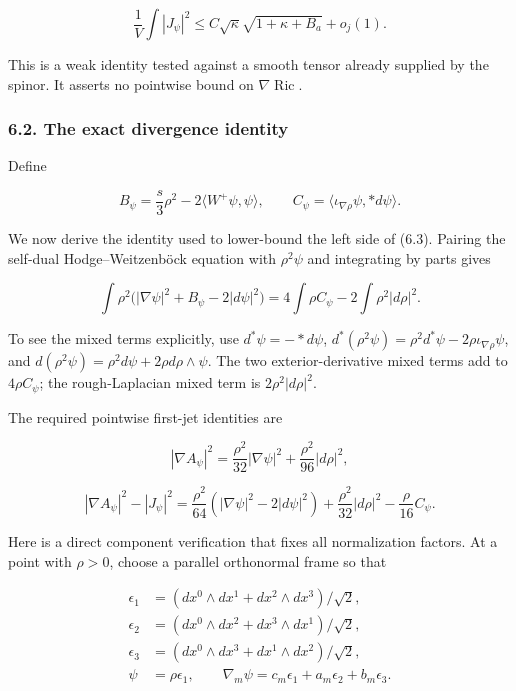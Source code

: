 \documentclass[
  11pt,
]{article}
\begin{document}
\[
 \frac1V\int|J_\psi|^2
            \le C\sqrt\kappa\sqrt{1+\kappa+B_a}+o_j(1).
 \tag{6.3}
\]

This is a weak identity tested against a smooth tensor already supplied
by the spinor. It asserts no pointwise bound on
\(\nabla\operatorname{Ric}\).

\hypertarget{the-exact-divergence-identity}{%
\subsubsection{6.2. The exact divergence
identity}\label{the-exact-divergence-identity}}

Define

\[
 B_\psi=\frac{s}{3}\rho^2-2\langle W^+\psi,\psi\rangle,
 \qquad C_\psi=\langle\iota_{\nabla\rho}\psi,*d\psi\rangle.
\]

We now derive the identity used to lower-bound the left side of (6.3).
Pairing the self-dual Hodge--Weitzenböck equation with \(\rho^2\psi\)
and integrating by parts gives

\[
 \int\rho^2\bigl(|\nabla\psi|^2+B_\psi-2|d\psi|^2\bigr)
          =4\int\rho C_\psi-2\int\rho^2|d\rho|^2.
 \tag{6.4}
\]

To see the mixed terms explicitly, use \(d^*\psi=-*d\psi\),
\(d^*(\rho^2\psi)=\rho^2d^*\psi-2\rho\iota_{\nabla\rho}\psi\), and
\(d(\rho^2\psi)=\rho^2d\psi+2\rho d\rho\wedge\psi\). The two
exterior-derivative mixed terms add to \(4\rho C_\psi\); the
rough-Laplacian mixed term is \(2\rho^2|d\rho|^2\).

The required pointwise first-jet identities are

\[
 |\nabla A_\psi|^2
       =\frac{\rho^2}{32}|\nabla\psi|^2
                                +\frac{\rho^2}{96}|d\rho|^2,
 \tag{6.5}
\]

\[
 |\nabla A_\psi|^2-|J_\psi|^2
    =\frac{\rho^2}{64}(|\nabla\psi|^2-2|d\psi|^2)
      +\frac{\rho^2}{32}|d\rho|^2-\frac\rho{16}C_\psi.
 \tag{6.6}
\]

Here is a direct component verification that fixes all normalization
factors. At a point with \(\rho>0\), choose a parallel orthonormal frame
so that

\[
 \begin{split}
 \epsilon_1&=(dx^0\wedge dx^1+dx^2\wedge dx^3)/\sqrt2,\\
 \epsilon_2&=(dx^0\wedge dx^2+dx^3\wedge dx^1)/\sqrt2,\\
 \epsilon_3&=(dx^0\wedge dx^3+dx^1\wedge dx^2)/\sqrt2,\\
 \psi&=\rho\epsilon_1,\qquad
 \nabla_m\psi=c_m\epsilon_1+a_m\epsilon_2+b_m\epsilon_3.
 \end{split}
\]
\end{document}

